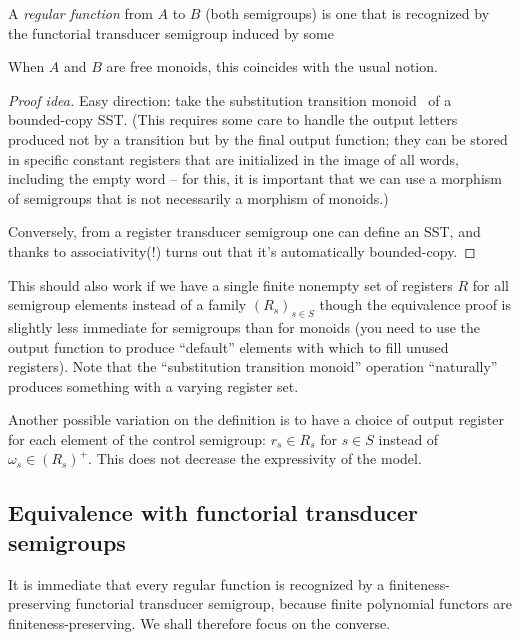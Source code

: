 \documentclass[a4paper,UKenglish,cleveref, autoref, thm-restate, numberwithinsect]{lipics-v2021}
\begin{document}
\begin{definition}
    A \emph{regular function} from $A$ to $B$ (both semigroups) is one that is recognized by the functorial transducer semigroup induced by some 
\end{definition}

\begin{theorem}
    When $A$ and $B$ are free monoids, this coincides with the usual notion.
\end{theorem}
\begin{proof}[Proof idea]
    Easy direction: take the substitution transition monoid~\cite{AperiodicSST} of a bounded-copy SST. (This requires some care to handle the output letters produced not by a transition but by the final output function; they can be stored in specific constant registers that are initialized in the image of all words, including the empty word -- for this, it is important that we can use a morphism of semigroups that is not necessarily a morphism of monoids.)
    
    Conversely, from a register transducer semigroup one can define an SST, and thanks to associativity(!) turns out that it's automatically bounded-copy.
\end{proof}

\begin{remark}
This should also work if we have a single finite nonempty set of registers $R$ for all semigroup elements instead of a family $(R_s)_{s\in S}$ though the equivalence proof is slightly less immediate for semigroups than for monoids (you need to use the output function to produce \enquote{default} elements with which to fill unused registers). Note that the \enquote{substitution transition monoid} operation \enquote{naturally} produces something with a varying register set.

Another possible variation on the definition is to have a choice of output register for each element of the control semigroup: $r_s \in R_s$ for $s\in S$ instead of $\omega_s \in (R_s)^+$. This does not decrease the expressivity of the model.
\end{remark}

\subsection{Equivalence with functorial transducer semigroups}

It is immediate that every regular function is recognized by a finiteness-preserving functorial transducer semigroup, because finite polynomial functors are finiteness-preserving. We shall therefore focus on the converse.
\end{document}
